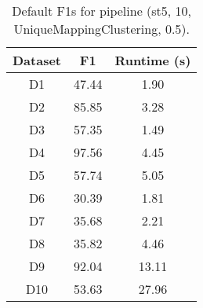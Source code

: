 \begin{table*}[ht!]
\centering
\caption{Default F1s for pipeline (st5, 10, UniqueMappingClustering, 0.5).}
\label{tab:global-bestf1s}
\begin{tabular}{|c|c|c|}
\toprule
Dataset & F1 & Runtime (s)\\
\midrule
D1 & 47.44 & 1.90 \\
D2 & 85.85 & 3.28 \\
D3 & 57.35 & 1.49 \\
D4 & 97.56 & 4.45 \\
D5 & 57.74 & 5.05 \\
D6 & 30.39 & 1.81 \\
D7 & 35.68 & 2.21 \\
D8 & 35.82 & 4.46 \\
D9 & 92.04 & 13.11 \\
D10 & 53.63 & 27.96 \\
\bottomrule
\end{tabular}
\end{table*}